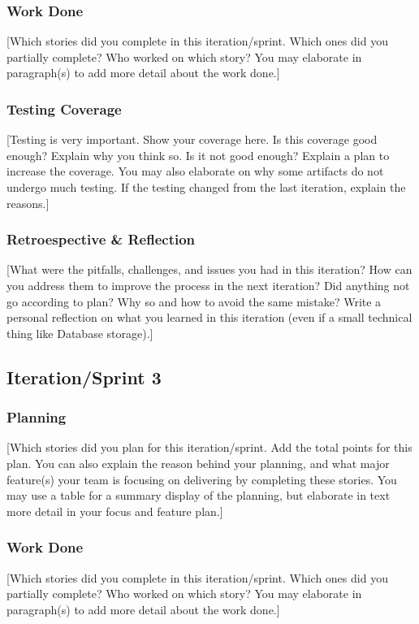 \documentclass{article}
\begin{document}
\subsubsection{Work Done}
[Which stories did you complete in this iteration/sprint. Which ones did you partially complete? Who worked on which story? You may elaborate in paragraph(s) to add more detail about the work done.]

\subsubsection{Testing Coverage}
[Testing is very important. Show your coverage here. Is this coverage good enough? Explain why you think so. Is it not good enough? Explain a plan to increase the coverage. You may also elaborate on why some artifacts do not undergo much testing. If the testing changed from the last iteration, explain the reasons.]

\subsubsection{Retroespective \& Reflection}
[What were the pitfalls, challenges, and issues you had in this iteration? How can you address them to improve the process in the next iteration? Did anything not go according to plan? Why so and how to avoid the same mistake? Write a personal reflection on what you learned in this iteration (even if a small technical thing like Database storage).]

\subsection{Iteration/Sprint 3}
\subsubsection{Planning}
[Which stories did you plan for this iteration/sprint. Add the total points for this plan. You can also explain the reason behind your planning, and what major feature(s) your team is focusing on delivering by completing these stories. You may use a table for a summary display of the planning, but elaborate in text more detail in your focus and feature plan.]

\subsubsection{Work Done}
[Which stories did you complete in this iteration/sprint. Which ones did you partially complete? Who worked on which story? You may elaborate in paragraph(s) to add more detail about the work done.]
\end{document}
